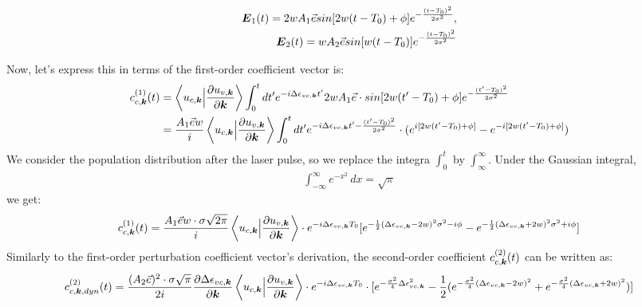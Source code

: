 \begin{align}
   \boldsymbol E_1(t)=2wA_1 \vec e sin[2w(t-T_0)+\phi]  e^{-\frac{(t-T_0)^2}{2\sigma^2}}, \\
   \boldsymbol E_2(t)=wA_2 \vec e sin[w(t-T_0)]  e^{-\frac{(t-T_0)^2}{2\sigma^2}}
   \label{feild}
\end{align}

Now, let's express this in terms of the first-order coefficient vector is:
\begin{equation}
\begin{aligned}
     c^{(1)}_{c,\boldsymbol k}(t) &= \left \langle u_{c,\boldsymbol k}\Big |\frac{\partial u_{v,\boldsymbol k}}{\partial \boldsymbol k} \right \rangle \int_0^t dt' e^{-i \Delta \epsilon_{vc,\boldsymbol k}t'} 
      2wA_1 \vec e \cdot sin[2w(t'-T_0)+\phi]  e^{-\frac{(t'-T_0)^2}{2\sigma^2}}\\
      &=\frac{A_1 \vec e w}{i} \left \langle u_{c,\boldsymbol k}\Big |\frac{\partial u_{v,\boldsymbol k}}{\partial \boldsymbol k} \right \rangle \int_0^t dt' e^{-i \Delta \epsilon_{vc,\boldsymbol k}t' - \frac{(t'-T_0)^2}{2\sigma^2}} 
      \cdot (e^{i[2w(t'-T_0)+\phi]}-e^{-i[2w(t'-T_0)+\phi]}) 
\end{aligned}
\end{equation}
We consider the population distribution after the laser pulse, so we replace the integra $\int_0^t$ by $\int_\infty^\infty$. Under the Gaussian integral, 
\begin{align}
\int_{-\infty}^{\infty} e^{-x^2} \, dx = \sqrt{\pi}
\end{align}
we get:
\begin{equation}
\begin{aligned}
     c^{(1)}_{c,\boldsymbol k}(t) = \frac{A_1 \vec e w \cdot \sigma \sqrt{2\pi}}{i} \left \langle u_{c,\boldsymbol k}\Big |\frac{\partial u_{v,\boldsymbol k}}{\partial \boldsymbol k} \right \rangle \cdot  e^{-i\Delta \epsilon_{vc,\boldsymbol k} T_0}
    [e^{-\frac{1}{2}(\Delta \epsilon_{vc,\boldsymbol k} - 2w)^2 \sigma^2-i\phi}
    -e^{-\frac{1}{2}(\Delta \epsilon_{vc,\boldsymbol k} + 2w)^2 \sigma^2+i\phi}]
\end{aligned}
\end{equation}
Similarly to the first-order perturbation coefficient vector's derivation, the second-order coefficient $c^{(2)}_{c,\boldsymbol k}(t)$ can be written as:
\begin{equation}
\begin{aligned}
    c^{(2)}_{c,\boldsymbol k,dyn}(t)=\frac{(A_2 \vec e)^2 \cdot \sigma \sqrt{\pi}}{2i} \frac{\partial  \Delta \epsilon_{vc,\boldsymbol k}}{\partial \boldsymbol k} \left \langle u_{c,\boldsymbol k}\Big |\frac{\partial u_{v,\boldsymbol k}}{\partial \boldsymbol k} \right \rangle \cdot e^{-i\Delta \epsilon_{vc,\boldsymbol k} T_0}
    \cdot [e^{-\frac{\sigma^2}{4} \Delta \epsilon_{vc,\boldsymbol k} ^2}-\frac{1}{2}(e^{-\frac{\sigma^2}{4} (\Delta \epsilon_{vc,\boldsymbol k}-2w)^2}+e^{-\frac{\sigma^2}{4} (\Delta \epsilon_{vc,\boldsymbol k}+2w)^2})]
\end{aligned}
\end{equation}

